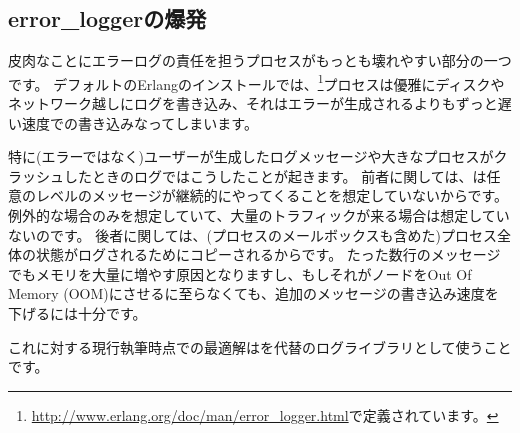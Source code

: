 \subsection{error\_loggerの爆発}

皮肉なことにエラーログの責任を担うプロセスがもっとも壊れやすい部分の一つです。
デフォルトのErlangのインストールでは、\footnote{\href{http://www.erlang.org/doc/man/error\_logger.html}{http://www.erlang.org/doc/man/error\_logger.html}で定義されています。}プロセスは優雅にディスクやネットワーク越しにログを書き込み、それはエラーが生成されるよりもずっと遅い速度での書き込みなってしまいます。

特に(エラーではなく)ユーザーが生成したログメッセージや大きなプロセスがクラッシュしたときのログではこうしたことが起きます。
前者に関しては、は任意のレベルのメッセージが継続的にやってくることを想定していないからです。
例外的な場合のみを想定していて、大量のトラフィックが来る場合は想定していないのです。
後者に関しては、(プロセスのメールボックスも含めた)プロセス全体の状態がログされるためにコピーされるからです。
たった数行のメッセージでもメモリを大量に増やす原因となりますし、もしそれがノードをOut Of Memory (OOM)にさせるに至らなくても、追加のメッセージの書き込み速度を下げるには十分です。

これに対する現行執筆時点での最適解は\href{https://github.com/basho/lager}{}を代替のログライブラリとして使うことです。

